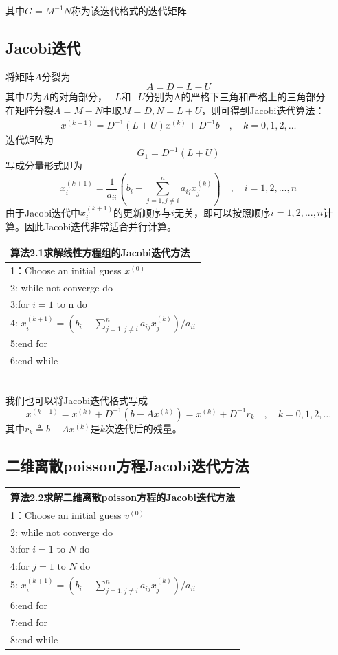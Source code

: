 \documentclass[12pt,a4paper]{article}
\begin{document}
其中$G=M^{-1} N$称为该迭代格式的{\color{blue}迭代矩阵}
\subsection{\color{blue}Jacobi迭代}
将矩阵$A$分裂为$$A=D-L-U$$
其中$D$为$A$的对角部分，$-L$和$-U$分别为A的严格下三角和严格上的三角部分\\
在矩阵分裂$A=M-N$中取$M=D, N=L+U$，则可得到{\color{blue}Jacobi迭代}算法：
\begin{align}
x^{(k+1)}=D^{-1}(L+U) x^{(k)}+D^{-1} b \quad, \quad k=0,1,2, \ldots
\tag{6.8}
\end{align}
迭代矩阵为
$$
G_{1}=D^{-1}(L+U)
$$
写成分量形式即为
$$
x_{i}^{(k+1)}=\frac{1}{a_{i i}}\left(b_{i}-\sum_{j=1, j \neq i}^{n} a_{i j} x_{j}^{(k)}\right) \quad, \quad i=1,2, \ldots, n
$$
由于Jacobi迭代中$x_i^{(k+1)}$的更新顺序与$i$无关，即可以按照顺序$i=1,2,...,n$计算。因此Jacobi迭代非常适合并行计算。\\
\begin{tabular}{l}
\hline
{\color{blue}算法2.1}求解线性方程组的Jacobi迭代方法\\
\hline
1：Choose an initial guess $x^{(0)}$\\
2: while not converge do\\
3:\qquad for $i=1$ to n do\\
4:\qquad \qquad
$
x_{i}^{(k+1)}=\left(b_{i}-\sum_{j=1, j \neq i}^{n} a_{i j} x_{j}^{(k)}\right) / a_{i i}
$\\
5:\qquad end for\\
6:end while\\
\hline
\end{tabular}\\
我们也可以将Jacobi迭代格式写成\\
$$
x^{(k+1)}=x^{(k)}+D^{-1}\left(b-A x^{(k)}\right)=x^{(k)}+D^{-1} r_{k} \quad, \quad k=0,1,2, \ldots
$$
其中$r_{k} \triangleq b-A x^{(k)}$是$k$次迭代后的残量。\\
\subsection*{二维离散poisson方程Jacobi迭代方法}
\begin{tabular}{l}
\hline
{\color{blue}算法2.2}求解二维离散poisson方程的Jacobi迭代方法\\
\hline
1：Choose an initial guess $v^{(0)}$\\
2: while not converge do\\
3:\qquad for $i=1$ to $N$ do\\
4:\qquad \qquad for $j=1$ to $N$ do\\
5:\qquad \qquad \qquad
$
x_{i}^{(k+1)}=\left(b_{i}-\sum_{j=1, j \neq i}^{n} a_{i j} x_{j}^{(k)}\right) / a_{i i}
$\\
6:\qquad \qquad end for\\
7:\qquad end for\\
8:end while\\
\hline
\end{tabular}
\end{document}
